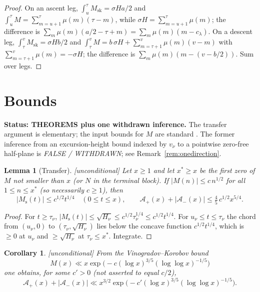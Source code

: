 \documentclass[11pt]{amsart}
\numberwithin{equation}{section}
\theoremstyle{plain}
\newtheorem{lemma}[theorem]{Lemma}
\newtheorem{corollary}[theorem]{Corollary}
\theoremstyle{definition}
\theoremstyle{remark}
\newcommand{\Ms}{M_{\mathrm{s}}}
\newcommand{\Msk}{M_{\mathrm{sk}}}
\newcommand{\Ap}{\mathcal{A}_{+}}
\newcommand{\Am}{\mathcal{A}_{-}}
\begin{document}
\begin{proof}
On an ascent leg, $\int_{u}^{\tau}\Msk=\sigma H a/2$ and
$\int_u^\tau M=\sum_{m=u+1}^{\tau}\mu(m)(\tau-m)$, while
$\sigma H=\sum_{m=u+1}^{\tau}\mu(m)$; the difference is
$\sum_m\mu(m)(a/2-\tau+m)=\sum_m\mu(m)(m-c_\lambda)$. On a descent leg,
$\int_\tau^v\Msk=\sigma Hb/2$ and
$\int_\tau^vM=b\,\sigma H+\sum_{m=\tau+1}^{v}\mu(m)(v-m)$ with
$\sum_{m=\tau+1}^{v}\mu(m)=-\sigma H$; the difference is
$\sum_m\mu(m)(m-(v-b/2))$. Sum over legs.
\end{proof}

\section{Bounds}
\label{sec:bounds}

\noindent\textbf{Status: THEOREMS plus one withdrawn inference.} The
transfer argument is elementary; the input bounds for $M$ are standard
\cite{Walfisz1963,OdlyzkoTeRiele1985,KotnikTeRiele2006,Hurst18}. The
former inference from an excursion-height bound indexed by $v_\nu$ to a
pointwise zero-free half-plane is \emph{FALSE / WITHDRAWN}; see
Remark~\ref{rem:onedirection}.

\begin{lemma}[Transfer]
\label{lem:transfer}
\emph{[unconditional]} Let $x\ge1$ and let $x^*\ge x$ be the first zero of
$M$ not smaller than $x$ (or $N$ in the terminal block). If
$|M(n)|\le c\,n^{1/2}$ for all $1\le n\le x^*$ (so necessarily $c\ge1$),
then
\begin{equation}
\label{eq:transfer_bound}
  |\Ms(t)|\le c^{1/2}t^{1/4}\quad(0\le t\le x),\qquad
  \Ap(x)+|\Am(x)|\le\tfrac45\,c^{1/2}x^{5/4}.
\end{equation}
\end{lemma}

\begin{proof}
For $t\ge\tau_\nu$, $|\Ms(t)|\le\sqrt{H_\nu}\le c^{1/2}\tau_\nu^{1/4}\le
c^{1/2}t^{1/4}$. For $u_\nu\le t\le\tau_\nu$ the chord from $(u_\nu,0)$ to
$(\tau_\nu,\sqrt{H_\nu})$ lies below the concave function $c^{1/2}t^{1/4}$,
which is $\ge0$ at $u_\nu$ and $\ge\sqrt{H_\nu}$ at $\tau_\nu\le x^*$.
Integrate.
\end{proof}

\begin{corollary}
\label{cor:uncond}
\emph{[unconditional]} From the Vinogradov--Korobov bound
\cite{Walfisz1963}
\begin{equation}
\label{eq:VK_M}
  M(x)\ll x\exp\bigl(-c(\log x)^{3/5}(\log\log x)^{-1/5}\bigr)
\end{equation}
one obtains, for some $c'>0$ (not asserted to equal $c/2$),
\begin{equation}
\label{eq:uncond_area}
  \Ap(x)+|\Am(x)|\ll x^{3/2}\exp\bigl(-c'(\log x)^{3/5}(\log\log x)^{-1/5}\bigr).
\end{equation}
\end{corollary}
\end{document}

